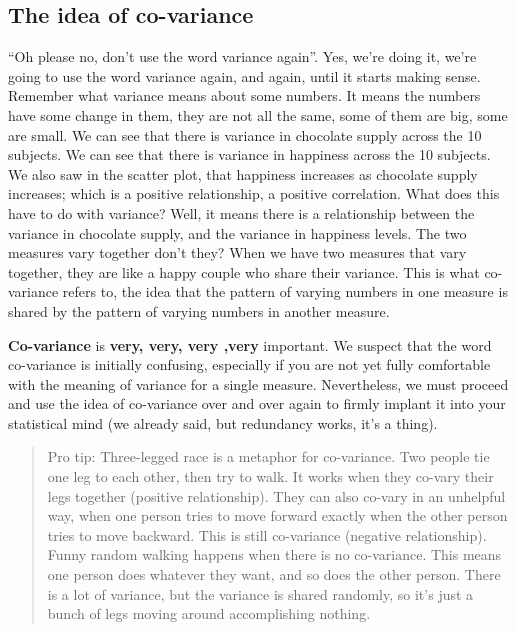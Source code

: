 \documentclass[]{book}
\begin{document}
\hypertarget{the-idea-of-co-variance}{%
\subsection{The idea of co-variance}\label{the-idea-of-co-variance}}

``Oh please no, don't use the word variance again''. Yes, we're doing it, we're going to use the word variance again, and again, until it starts making sense. Remember what variance means about some numbers. It means the numbers have some change in them, they are not all the same, some of them are big, some are small. We can see that there is variance in chocolate supply across the 10 subjects. We can see that there is variance in happiness across the 10 subjects. We also saw in the scatter plot, that happiness increases as chocolate supply increases; which is a positive relationship, a positive correlation. What does this have to do with variance? Well, it means there is a relationship between the variance in chocolate supply, and the variance in happiness levels. The two measures vary together don't they? When we have two measures that vary together, they are like a happy couple who share their variance. This is what co-variance refers to, the idea that the pattern of varying numbers in one measure is shared by the pattern of varying numbers in another measure.

\textbf{Co-variance} is \textbf{very, very, very ,very} important. We suspect that the word co-variance is initially confusing, especially if you are not yet fully comfortable with the meaning of variance for a single measure. Nevertheless, we must proceed and use the idea of co-variance over and over again to firmly implant it into your statistical mind (we already said, but redundancy works, it's a thing).

\begin{quote}
Pro tip: Three-legged race is a metaphor for co-variance. Two people tie one leg to each other, then try to walk. It works when they co-vary their legs together (positive relationship). They can also co-vary in an unhelpful way, when one person tries to move forward exactly when the other person tries to move backward. This is still co-variance (negative relationship). Funny random walking happens when there is no co-variance. This means one person does whatever they want, and so does the other person. There is a lot of variance, but the variance is shared randomly, so it's just a bunch of legs moving around accomplishing nothing.
\end{quote}
\end{document}
